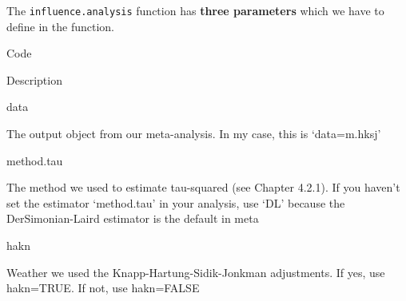 \documentclass[]{book}
\newenvironment{Shaded}{\begin{snugshade}}{\end{snugshade}}
\newcommand{\ControlFlowTok}[1]{\textcolor[rgb]{0.13,0.29,0.53}{\textbf{#1}}}
\newcommand{\DataTypeTok}[1]{\textcolor[rgb]{0.13,0.29,0.53}{#1}}
\newcommand{\DecValTok}[1]{\textcolor[rgb]{0.00,0.00,0.81}{#1}}
\newcommand{\KeywordTok}[1]{\textcolor[rgb]{0.13,0.29,0.53}{\textbf{#1}}}
\newcommand{\NormalTok}[1]{#1}
\newcommand{\OperatorTok}[1]{\textcolor[rgb]{0.81,0.36,0.00}{\textbf{#1}}}
\newcommand{\StringTok}[1]{\textcolor[rgb]{0.31,0.60,0.02}{#1}}
\begin{document}
\begin{Shaded}
\end{Shaded}

The \texttt{influence.analysis} function has \textbf{three parameters} which we have to define in the function.

Code

Description

data

The output object from our meta-analysis. In my case, this is `data=m.hksj'

method.tau

The method we used to estimate tau-squared (see Chapter 4.2.1). If you haven't set the estimator `method.tau' in your analysis, use `DL' because the DerSimonian-Laird estimator is the default in meta

hakn

Weather we used the Knapp-Hartung-Sidik-Jonkman adjustments. If yes, use hakn=TRUE. If not, use hakn=FALSE
\end{document}
